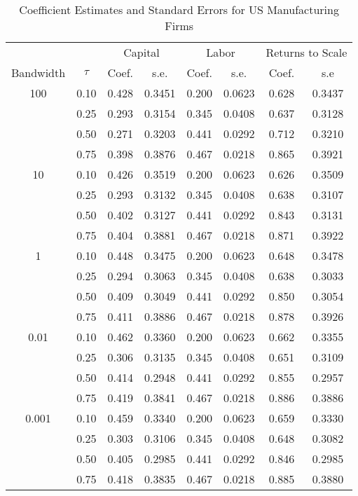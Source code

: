 \begin{table}[ht]
\centering
\caption{Coefficient Estimates and Standard Errors for US Manufacturing Firms} 
\begin{tabular}{cccccccc}
  \hline\hline & & \multicolumn{2}{c}{Capital}  & \multicolumn{2}{c}{Labor} & \multicolumn{2}{c}{Returns to Scale} \\ \cmidrule(lr){3-4} \cmidrule(lr){5-6} \cmidrule(lr){7-8}Bandwidth & $\tau$ & Coef. & s.e. & Coef. & s.e. & Coef. & s.e \\ 
  \hline
100 & 0.10 & 0.428 & 0.3451 & 0.200 & 0.0623 & 0.628 & 0.3437 \\ 
   & 0.25 & 0.293 & 0.3154 & 0.345 & 0.0408 & 0.637 & 0.3128 \\ 
   & 0.50 & 0.271 & 0.3203 & 0.441 & 0.0292 & 0.712 & 0.3210 \\ 
   & 0.75 & 0.398 & 0.3876 & 0.467 & 0.0218 & 0.865 & 0.3921 \\ 
  10 & 0.10 & 0.426 & 0.3519 & 0.200 & 0.0623 & 0.626 & 0.3509 \\ 
   & 0.25 & 0.293 & 0.3132 & 0.345 & 0.0408 & 0.638 & 0.3107 \\ 
   & 0.50 & 0.402 & 0.3127 & 0.441 & 0.0292 & 0.843 & 0.3131 \\ 
   & 0.75 & 0.404 & 0.3881 & 0.467 & 0.0218 & 0.871 & 0.3922 \\ 
  1 & 0.10 & 0.448 & 0.3475 & 0.200 & 0.0623 & 0.648 & 0.3478 \\ 
   & 0.25 & 0.294 & 0.3063 & 0.345 & 0.0408 & 0.638 & 0.3033 \\ 
   & 0.50 & 0.409 & 0.3049 & 0.441 & 0.0292 & 0.850 & 0.3054 \\ 
   & 0.75 & 0.411 & 0.3886 & 0.467 & 0.0218 & 0.878 & 0.3926 \\ 
  0.01 & 0.10 & 0.462 & 0.3360 & 0.200 & 0.0623 & 0.662 & 0.3355 \\ 
   & 0.25 & 0.306 & 0.3135 & 0.345 & 0.0408 & 0.651 & 0.3109 \\ 
   & 0.50 & 0.414 & 0.2948 & 0.441 & 0.0292 & 0.855 & 0.2957 \\ 
   & 0.75 & 0.419 & 0.3841 & 0.467 & 0.0218 & 0.886 & 0.3886 \\ 
  0.001 & 0.10 & 0.459 & 0.3340 & 0.200 & 0.0623 & 0.659 & 0.3330 \\ 
   & 0.25 & 0.303 & 0.3106 & 0.345 & 0.0408 & 0.648 & 0.3082 \\ 
   & 0.50 & 0.405 & 0.2985 & 0.441 & 0.0292 & 0.846 & 0.2985 \\ 
   & 0.75 & 0.418 & 0.3835 & 0.467 & 0.0218 & 0.885 & 0.3880 \\ 
   \hline
\end{tabular}
\end{table}
